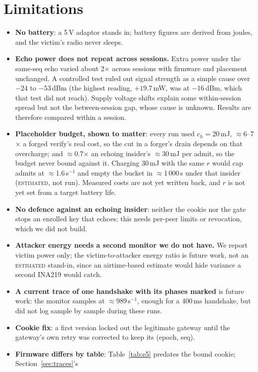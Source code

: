 \documentclass[conference]{IEEEtran}
\newcommand{\est}{\textsc{estimated}}
\begin{document}
\section{Limitations}\label{sec:lim}
\begin{itemize}
\item \textbf{No battery}: a 5\,V adaptor stands in; battery figures are derived from joules, and the victim's radio
never sleeps.
\item \textbf{Echo power does not repeat across sessions.} Extra power under the same-seq echo varied about
2$\times$ across sessions with firmware and placement unchanged. A controlled test ruled out signal strength as a
simple cause over $-24$ to $-53$\,dBm (the highest reading, $+19.7$\,mW, was at $-16$\,dBm, which that test did not
reach). Supply voltage shifts explain some within-session spread but not the between-session gap, whose cause is
unknown. Results are therefore compared within a session.
\item \textbf{Placeholder budget, shown to matter}: every run used $c_h=20$\,mJ, $\approx$6--7$\times$ a forged
verify's real cost, so the cut in a forger's drain depends on that overcharge; and $\approx$0.7$\times$ an echoing
insider's $\approx$30\,mJ per admit, so the budget never bound against it. Charging 30\,mJ with the same $r$ would cap
admits at $\approx$1.6\,s$^{-1}$ and empty the bucket in $\approx$1\,000\,s under that insider (\est{}, not run).
Measured costs are not yet written back, and $r$ is not yet set from a target battery life.
\item \textbf{No defence against an echoing insider}: neither the cookie nor the gate stops an enrolled key that
echoes; this needs per-peer limits or revocation, which we did not build.
\item \textbf{Attacker energy needs a second monitor we do not have.} We report victim power only; the
victim-to-attacker energy ratio is future work, not an \est{} stand-in, since an airtime-based estimate would hide
variance a second INA219 would catch.
\item \textbf{A current trace of one handshake with its phases marked} is future work: the monitor samples at
$\approx$989\,s$^{-1}$, enough for a 400\,ms handshake, but did not log sample by sample during these runs.
\item \textbf{Cookie fix}: a first version locked out the legitimate gateway until the gateway's own retry was
corrected to keep its (epoch, seq).
\item \textbf{Firmware differs by table}: Table~\ref{tab:e5} predates the bound cookie; Section~\ref{sec:traces}'s

\end{itemize}
\end{document}

